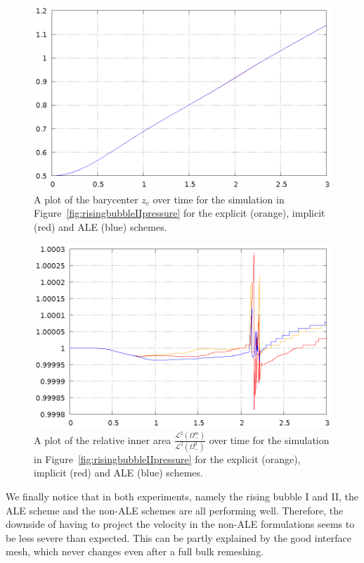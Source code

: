 \documentclass[a4paper,12pt,onecolumn]{article}
\begin{document}
\begin{figure}[htbp]
\centering
\includegraphics[width=.45\textwidth]
{figures/rising_bubble_II_barycenter.ps}
\caption[Navier--Stokes rising bubble II barycenter]
{A plot of the barycenter $z_c$ over time for the simulation in
Figure~\ref{fig:risingbubbleIIpressure} for the explicit (orange), implicit
(red) and ALE (blue) schemes.}
\label{fig:risingbubbleIIbarycenter}
\end{figure}

\begin{figure}[htbp]
\centering
\includegraphics[width=.45\textwidth]
{figures/rising_bubble_II_inner_volume.ps}
\caption[Navier--Stokes rising bubble II inner area]
{A plot of the relative inner area
$\frac{\mathcal{L}^2(\Omega^m_-)}{\mathcal{L}^2(\Omega^0_-)}$ over time for the
simulation in Figure~\ref{fig:risingbubbleIIpressure} for the explicit
(orange), implicit (red) and ALE (blue) schemes.}
\label{fig:risingbubbleIIinnervolume}
\end{figure}

We finally notice that in both experiments, namely the rising bubble I and II,
the ALE scheme and the non-ALE schemes are all performing well. Therefore, the
downside of having to project the velocity in the non-ALE formulations seems to
be less severe than expected. This can be partly explained by the good
interface mesh, which never changes even after a full bulk remeshing.



\end{document}
